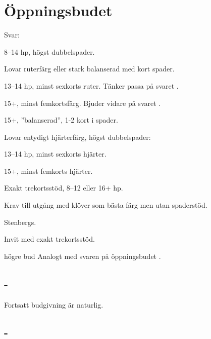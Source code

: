 \section{{\"O}ppningsbudet }

Svar:
\begin{beskriv}

   \item[\NT{1}] 8--14 hp, h\"ogst dubbelspader.
   \item[\kl{2}] Lovar ruterf\"arg eller stark balanserad med kort spader.
         \begin{nummer}
           \item 13--14 hp, minst sexkorts ruter.
                 T{\"a}nker passa p{\aa} svaret .
           \item 15+, minst femkortsf{\"a}rg.
                      Bjuder vidare p{\aa} svaret .
	   \item 15+, ''balanserad'', 1-2 kort i spader.
          \end{nummer}

   \item[\ru{2}] Lovar entydigt hj\"arterf\"arg, högst dubbelspader:
          \begin{nummer}
            \item 13--14 hp, minst sexkorts hj{\"a}rter.
            \item 15+, minst femkorts hj{\"a}rter.
           \end{nummer}

   \item[\hj{2}] Exakt trekortsstöd, 8--12 eller 16+ hp. 

   \item[\spa{2}] Krav till utgång med klöver som bästa färg men utan
     spaderstöd. 

   \item[\NT{2}] Stenbergs.
   \item[\kl{3}] Invit med exakt trekortsstöd.
   \item[h\"ogre bud] Analogt med svaren p{\aa} \"oppningsbudet .
\end{beskriv}

\subsection{ - }

Fortsatt budgivning är naturlig.


\subsection{ - }


